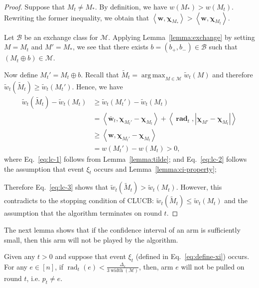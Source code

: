 \documentclass{article}
\newcommand{\Algorithm}{{\small \textsf{CLUCB}}\xspace}
\newcommand{\M}{\mathcal M}
\newcommand{\B}{\mathcal B}
\DeclareMathOperator{\rank}{width}
\DeclareMathOperator{\rad}{rad}
\DeclareMathOperator*{\argmax}{arg\,max}
\newcommand{\inn}[1]{\left\langle #1 \right\rangle}
\renewcommand{\vec}[1]{\boldsymbol{#1}}
\begin{document}
\begin{proof}
Suppose that $M_t \not= M_*$. 
By definition, we have $w(M_*)>w(M_t)$. 
Rewriting the former inequality, we obtain that $\inn{\vec w, \vec\chi_{M_*}} > \inn{\vec w,\vec\chi_{M_t}}$.

Let $\B$ be an exchange class for $\M$.
Applying Lemma~\ref{lemma:exchange} by setting $M=M_t$ and $M'=M_*$, we see that 
there exists $b=(b_+,b_-)\in \B$ such that $(M_t \oplus b) \in \M$.


Now define $M_t' = M_t \oplus b$.
Recall that $\tilde M_t =\argmax_{M\in \M} \tilde w_t(M)$ and therefore $\tilde w_t(\tilde M_t) \ge \tilde w_t(M_t')$.
Hence, we have
\begin{align}
  \tilde w_t(\tilde M_t)-\tilde w_t(M_t) 
  &\ge \tilde w_t(M_t')-\tilde w_t(M_t) \nonumber \\
  &= \inn{\vec {\bar w}_t, \vec \chi_{M_t'}-\vec\chi_{M_t}}+\inn{\vec \rad_t, |\vec \chi_{M'}-\vec\chi_{M_t}|} \label{eq:lc-1}\\
  &\ge \inn{\vec w, \vec \chi_{M_t'}-\vec\chi_{M_t}} \label{eq:lc-2}\\
  &= w(M_t')-w(M_t) > 0 \label{eq:lc-3},
\end{align}
where Eq.~\eqref{eq:lc-1} follows from Lemma~\ref{lemma:tilde};
and Eq.~\eqref{eq:lc-2} follows the assumption that event $\xi_t$ occurs and Lemma~\ref{lemma:ci-property};

Therefore Eq.~\eqref{eq:lc-3} shows that $\tilde w_t(\tilde M_t) > \tilde w_t(M_t)$. 
However, this contradicts to the stopping condition of \Algorithm: $\tilde w_t(\tilde M_t) \le \tilde w_t(M_t)$ and the assumption that the algorithm terminates on round $t$.
\end{proof}



The next lemma shows that if the confidence interval of an arm is sufficiently small, then this arm will not be played by the algorithm. 
\begin{lemma}
\label{lemma:key-technical}
Given any $t>0$ and suppose that event $\xi_t$ (defined in Eq.~\eqref{eq:define-xi})  occurs.
For any $e\in [n]$, if $\rad_t(e) < \frac{\Delta_e}{3\rank(\M)}$, then, arm $e$ will not be pulled on round $t$, i.e. $p_t\not= e$.
\end{lemma}
\end{document}
